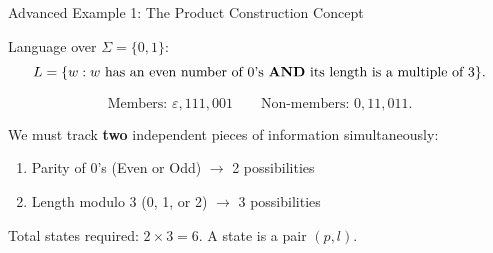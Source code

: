 \documentclass[10pt,aspectratio=169]{beamer}
\newcommand{\eps}{\varepsilon}
\begin{document}
\begin{frame}{Advanced Example 1: The Product Construction Concept}

Language over $\Sigma = \{0, 1\}$:
\[
L=\{w : w\text{ has an even number of } 0\text{'s \textbf{AND} its length is a multiple of } 3\}.
\]

\[
\text{Members: }\eps,111,001
\qquad
\text{Non-members: }0,11,011.
\]


We must track \textbf{two} independent pieces of information simultaneously:
\begin{enumerate}
\item Parity of $0$'s (Even or Odd) $\to$ 2 possibilities
\item Length modulo 3 (0, 1, or 2) $\to$ 3 possibilities
\end{enumerate}


Total states required: $2 \times 3 = 6$. A state is a pair $(p, l)$.

\end{frame}
\end{document}
